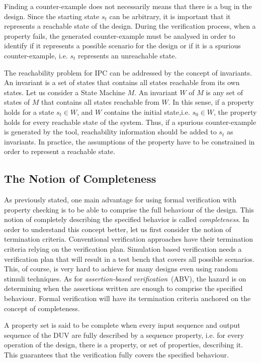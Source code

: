 Finding a counter-example does not necessarily means that there is a bug in the design. Since the starting state $s_t$ can be arbitrary, it is important that it represents a reachable state of the design. During the verification process, when a property fails, the generated counter-example must be analysed in order to identify if it represents a possible scenario for the design or if it is a spurious counter-example, i.e. $s_t$ represents an unreachable state.

The reachability problem for IPC can be addressed by the concept of invariants. An invariant is a set of states that contains all states reachable from its own states. Let us consider a State Machine $M$. An invariant $W$ of $M$ is any set of states of $M$ that contains all states reachable from $W$. In this sense, if a property holds for a state $s_t \in W$, and $W$  contains the initial state,i.e. $s_0 \in W$, the property holds for every reachable state of the system. Thus, if a spurious counter-example is generated by the tool, reachability information should be added to $s_t$ as invariants. In practice, the assumptions of the property have to be constrained in order to represent a reachable state. 

\subsection{The Notion of Completeness}
\label{subsection:notion-completeness}

As previously stated, one main advantage for using formal verification with property checking is to be able to comprise the full behaviour of the design. This notion of completely describing the specified behavior is called \textit{completeness}. In order to understand this concept better, let us first consider the notion of termination criteria. Conventional verification approaches have their termination criteria relying on the verification plan. Simulation based verification needs a verification plan that will result in a test bench that covers all possible scenarios. This, of course, is very hard to achieve for many designs even using random stimuli techniques. As for \textit{assertion-based verification}~(ABV), the hazard is on determining when the assertions written are enough to comprise the specified behaviour. Formal verification will have its termination criteria anchored on the concept of completeness.

A property set is said to be complete when every input sequence and output sequence of the DUV are fully described by a sequence property, i.e. for every operation of the design, there is a property, or set of properties, describing it. This guarantees that the verification fully covers the specified behaviour.

